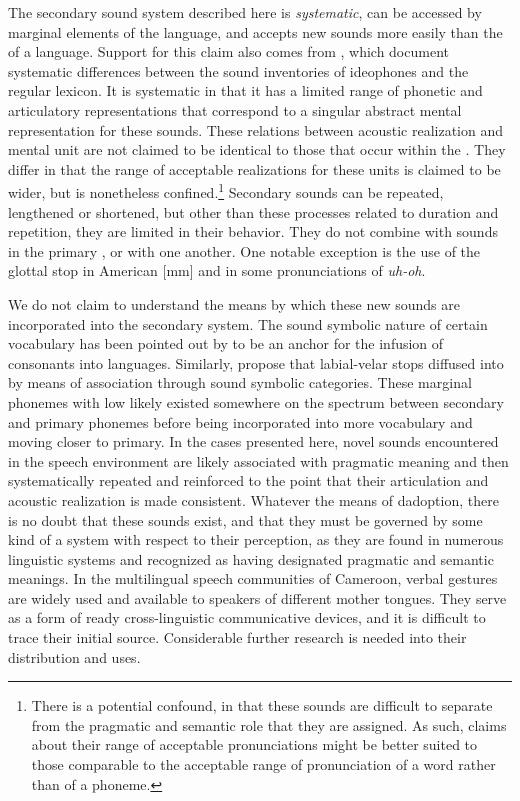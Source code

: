 \documentclass[output=paper,newtxmath,modfonts,nonflat,hidelinks]{langsci/langscibook}
\begin{document}
The secondary sound system described here is \textit{systematic}, can be accessed by marginal elements of the language, and accepts new sounds more easily than the  of a language. Support for this claim also comes from \citet{nuckollsetal2016}, which document systematic differences between the sound inventories of  ideophones and the regular lexicon. It is systematic in that it has a limited range of phonetic and articulatory representations that correspond to a singular abstract mental representation for these sounds. These relations between acoustic realization and mental unit are not claimed to be identical to those that occur within the . They differ in that the range of acceptable realizations for these units is claimed to be wider, but is nonetheless confined.\footnote{There is a potential confound, in that these sounds are difficult to separate from the pragmatic and semantic role that they are assigned. As such, claims about their range of acceptable pronunciations might be better suited to those comparable to the acceptable range of pronunciation of a word rather than of a phoneme.} Secondary sounds can be repeated, lengthened or shortened, but other than these processes related to duration and repetition, they are limited in their behavior. They do not combine with sounds in the primary , or with one another. One notable exception is the use of the glottal stop in American  [\textglotstop m\textglotstop m] and in some pronunciations of \textit{uh-oh}.

We do not claim to understand the means by which these new sounds are incorporated into the secondary system. The sound symbolic nature of certain vocabulary has been pointed out by \citet{BostoenSands2012} to be an anchor for the infusion of  consonants into  languages. Similarly, \citet{BostoenDonzo2013} propose that labial-velar stops diffused into  by means of association through sound symbolic categories. These marginal phonemes with low  likely existed somewhere on the spectrum between secondary and primary phonemes before being incorporated into more vocabulary and moving closer to primary. In the cases presented here, novel sounds encountered in the speech environment are likely associated with pragmatic meaning and then systematically repeated and reinforced to the point that their articulation and acoustic realization is made consistent. Whatever the means of dadoption, there is no doubt that these sounds exist, and that they must be governed by some kind of a system with respect to their perception, as they are found in numerous linguistic systems and recognized as having designated pragmatic and semantic meanings. In the multilingual speech communities of Cameroon, verbal gestures are widely used and available to speakers of different mother tongues. They serve as a form of ready cross-linguistic communicative devices, and it is difficult to trace their initial source. Considerable further research is needed into their distribution and uses.\\
\vspace{2em}
\end{document}
